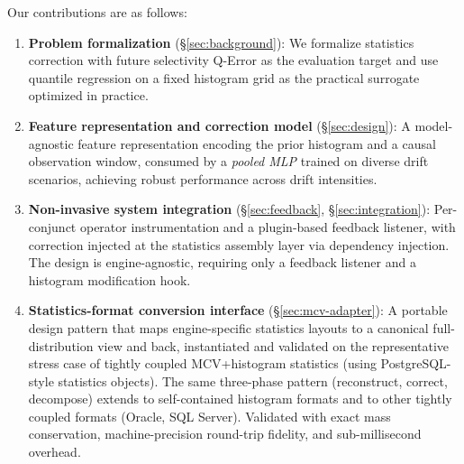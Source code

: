 \documentclass[runningheads]{llncs}
\begin{document}
Our contributions are as follows:
\begin{enumerate}
  \item \textbf{Problem formalization} (\S\ref{sec:background}): We formalize
        statistics correction with future selectivity Q-Error as the evaluation
        target and use quantile regression on a fixed histogram grid as the
        practical surrogate optimized in practice.

  \item \textbf{Feature representation and correction model}
        (\S\ref{sec:design}): A model-agnostic
        feature representation encoding the prior histogram and a
        causal observation window, consumed by a \emph{pooled MLP}
        trained on diverse drift scenarios, achieving robust
        performance across drift intensities.

  \item \textbf{Non-invasive system integration}
        (\S\ref{sec:feedback}, \S\ref{sec:integration}): Per-conjunct
        operator instrumentation and a plugin-based feedback listener,
        with correction injected at the statistics assembly layer via
        dependency injection. The design is engine-agnostic, requiring
        only a feedback listener and a histogram modification hook.

  \item \textbf{Statistics-format conversion interface}
        (\S\ref{sec:mcv-adapter}): A portable design pattern that maps
        engine-specific statistics layouts to a canonical full-distribution
        view and back, instantiated and validated on the representative
        stress case of tightly coupled MCV+histogram statistics
        (using PostgreSQL-style statistics objects).
        The same three-phase pattern (reconstruct, correct, decompose)
        extends to self-contained histogram formats and to other tightly
        coupled formats (Oracle, SQL Server).
        Validated with exact mass conservation, machine-precision
        round-trip fidelity, and sub-millisecond overhead.


\end{enumerate}
\end{document}
